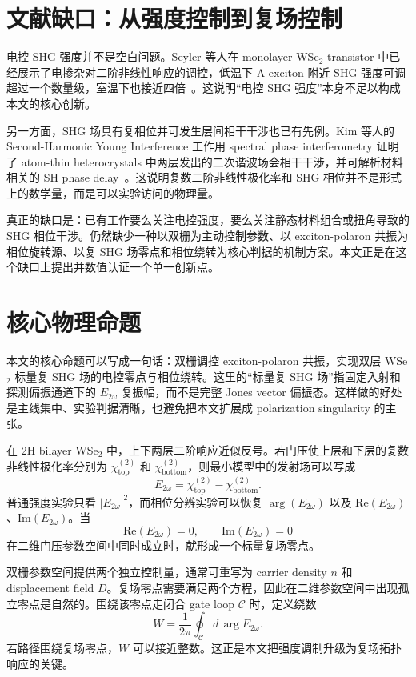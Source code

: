 \documentclass[UTF8,a4paper,11pt]{ctexart}
\begin{document}
\section{文献缺口：从强度控制到复场控制}
电控 SHG 强度并不是空白问题。Seyler 等人在 monolayer WSe$_2$ transistor 中已经展示了电掺杂对二阶非线性响应的调控，低温下 A-exciton 附近 SHG 强度可调超过一个数量级，室温下也接近四倍~\cite{seyler2015}。这说明“电控 SHG 强度”本身不足以构成本文的核心创新。

另一方面，SHG 场具有复相位并可发生层间相干干涉也已有先例。Kim 等人的 Second-Harmonic Young Interference 工作用 spectral phase interferometry 证明了 atom-thin heterocrystals 中两层发出的二次谐波场会相干干涉，并可解析材料相关的 SH phase delay~\cite{kim2020}。这说明复数二阶非线性极化率和 SHG 相位并不是形式上的数学量，而是可以实验访问的物理量。

真正的缺口是：已有工作要么关注电控强度，要么关注静态材料组合或扭角导致的 SHG 相位干涉。仍然缺少一种以双栅为主动控制参数、以 exciton-polaron 共振为相位旋转源、以复 SHG 场零点和相位绕转为核心判据的机制方案。本文正是在这个缺口上提出并数值认证一个单一创新点。

\section{核心物理命题}
本文的核心命题可以写成一句话：双栅调控 exciton-polaron 共振，实现双层 WSe$_2$ 标量复 SHG 场的电控零点与相位绕转。这里的“标量复 SHG 场”指固定入射和探测偏振通道下的 $E_{2\omega}$ 复振幅，而不是完整 Jones vector 偏振态。这样做的好处是主线集中、实验判据清晰，也避免把本文扩展成 polarization singularity 的主张。

在 2H bilayer WSe$_2$ 中，上下两层二阶响应近似反号。若门压使上层和下层的复数非线性极化率分别为 $\chi_{\mathrm{top}}^{(2)}$ 和 $\chi_{\mathrm{bottom}}^{(2)}$，则最小模型中的发射场可以写成
\begin{equation}
  E_{2\omega} = \chi_{\mathrm{top}}^{(2)}-\chi_{\mathrm{bottom}}^{(2)} .
\end{equation}
普通强度实验只看 $|E_{2\omega}|^2$，而相位分辨实验可以恢复 $\arg(E_{2\omega})$ 以及 $\mathrm{Re}(E_{2\omega})$、$\mathrm{Im}(E_{2\omega})$。当
\begin{equation}
  \mathrm{Re}(E_{2\omega})=0,\qquad \mathrm{Im}(E_{2\omega})=0
\end{equation}
在二维门压参数空间中同时成立时，就形成一个标量复场零点。

双栅参数空间提供两个独立控制量，通常可重写为 carrier density $n$ 和 displacement field $D$。复场零点需要满足两个方程，因此在二维参数空间中出现孤立零点是自然的。围绕该零点走闭合 gate loop $\mathcal{C}$ 时，定义绕数
\begin{equation}
  W = \frac{1}{2\pi}\oint_{\mathcal{C}} d\,\arg E_{2\omega}.
\end{equation}
若路径围绕复场零点，$W$ 可以接近整数。这正是本文把强度调制升级为复场拓扑响应的关键。
\end{document}
